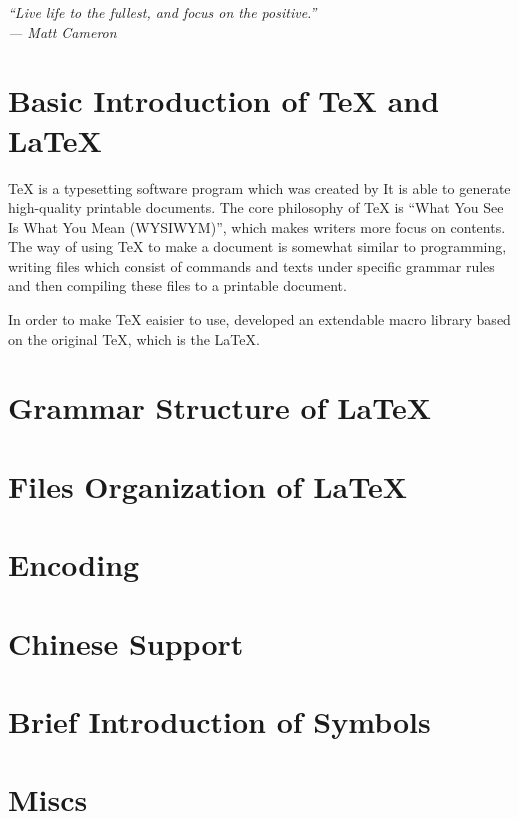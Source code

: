 
{   \itshape \large 
    \raggedleft
    ``Live life to the fullest, and focus on the positive.'' \\
    --- Matt Cameron \\
}
\section{Basic Introduction of \TeX{} and \LaTeX}

\TeX{} is a typesetting software program which was created by  
It is able to generate high-quality printable documents. The core philosophy of 
\TeX{} is ``What You See Is What You Mean (WYSIWYM)'', which makes writers more 
focus on contents. The way of using \TeX{} to make a document is somewhat similar
to programming, writing files which consist of commands and texts under 
specific grammar rules and then compiling these files to a printable document.

In order to make \TeX{} eaisier to use,  developed an extendable macro 
library based on the original \TeX{}, which is the \LaTeX.



\section{Grammar Structure of \LaTeX}



\section{Files Organization of \LaTeX}



\section{Encoding}
\section{Chinese Support}
\section{Brief Introduction of Symbols}
\section{Miscs}
